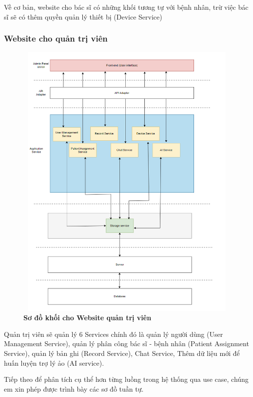 Về cơ bản, website cho bác sĩ có những khối tương tự với bệnh nhân, trừ việc bác sĩ sẽ có thêm quyền quản lý thiết bị (Device Service)

\subsubsection{Website cho quản trị viên}

\begin{figure}[H]
  \centering
  \includegraphics[width=12cm,height=14cm]{Images/system/fmECG_architecture-Admin.drawio.png}
  \caption[Sơ đồ khối cho Website quản trị viên]{\bfseries \fontsize{12pt}{0pt}\selectfont Sơ đồ khối cho Website quản trị viên}
  \label{fmECG_architecture-Admin} %
\end{figure}

Quản trị viên sẽ quản lý 6 Services chính đó là quản lý người dùng (User Management Service), quản lý phân công
bác sĩ - bệnh nhân (Patient Assignment Service), quản lý bản ghi (Record Service), Chat Service, Thêm dữ liệu mới để huấn luyện trợ lý ảo (AI service).

Tiếp theo để phân tích cụ thể hơn từng luồng trong hệ thống qua use case, chúng em xin phép được trình bày các sơ đồ tuần
tự. 
\newpage

